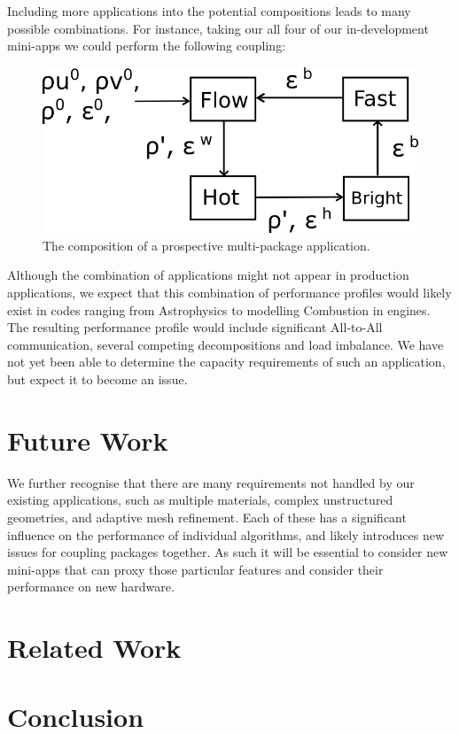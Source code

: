 \documentclass[runningheads,a4paper]{llncs}
\begin{document}
Including more applications into the potential compositions leads to many possible combinations. For instance, taking our all four of our in-development mini-apps we could perform the following coupling:

\begin{figure}
  \centering
  \includegraphics[width=0.6\linewidth]{all-four-flow}
  \caption{The composition of a prospective multi-package application.}
  \label{fig:multi-package-flow}
\end{figure}

Although the combination of applications might not appear in production applications, we expect that this combination of performance profiles would likely exist in codes ranging from Astrophysics to modelling Combustion in engines. The resulting performance profile would include significant All-to-All communication, several competing decompositions and load imbalance. We have not yet been able to determine the capacity requirements of such an application, but expect it to become an issue.

\section{Future Work}

We further recognise that there are many requirements not handled by our existing applications, such as multiple materials, complex unstructured geometries, and adaptive mesh refinement. Each of these has a significant influence on the performance of individual algorithms, and likely introduces new issues for coupling packages together. As such it will be essential to consider new mini-apps that can proxy those particular features and consider their performance on new hardware.

\section{Related Work}



\section{Conclusion}
\end{document}
